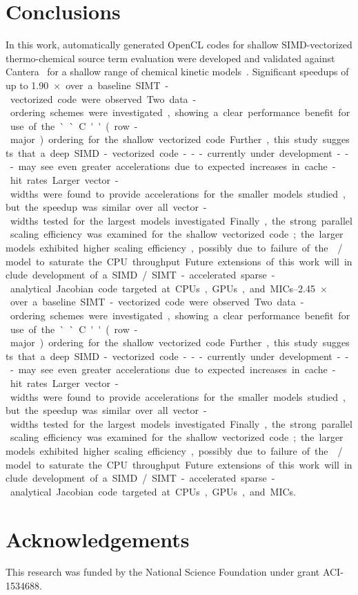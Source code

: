 \documentclass[12pt,number,sort&compress,preprint]{elsarticle}
\begin{document}
\section{Conclusions}
In this work, automatically generated OpenCL codes for shallow SIMD-vectorized thermo-chemical source term evaluation were developed and validated against Cantera~\cite{Cantera} for a shallow range of chemical kinetic models~\cite{Burke:2011fh,smith_gri-mech_30,Wang:2007,Sarathy:2013jr}.
Significant speedups of up to \SIrange{1.90}{2.45}{$\times$} over a baseline SIMT-vectorized code were observed.
Two data-ordering schemes were investigated, showing a clear performance benefit for use of the ``C'' (row-major) ordering for the shallow vectorized code.
Further, this study suggests that a deep SIMD-vectorized code---currently under development---may see even greater accelerations due to expected increases in cache-hit rates.
Larger vector-widths were found to provide accelerations for the smaller models studied, but the speedup was similar over all vector-widths tested for the largest models investigated.
Finally, the strong parallel scaling efficiency was examined for the shallow vectorized code; the larger models exhibited higher scaling efficiency, possibly due to failure of the \slash{} model to saturate the CPU throughput.
Future extensions of this work will include development of a SIMD\slash SIMT-accelerated sparse-analytical Jacobian code targeted at CPUs, GPUs, and MICs.

\section{Acknowledgements}
This research was funded by the National Science Foundation under grant ACI-1534688.


\end{document}
